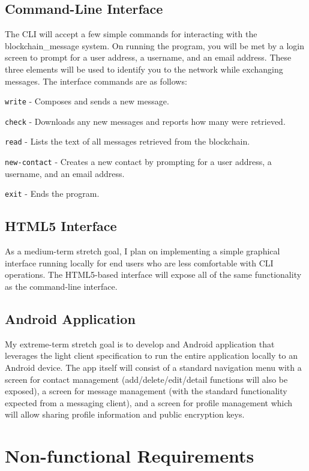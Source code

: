 \documentclass[titlepage]{report}
\begin{document}
\subsection{Command-Line Interface}
The CLI will accept a few simple commands for interacting with the blockchain\_message system. On running the program, you will be met by a login screen to prompt for a user address, a username, and an email address. These three elements will be used to identify you to the network while exchanging messages.
The interface commands are as follows:

\texttt{write} - Composes and sends a new message.

\texttt{check} - Downloads any new messages and reports how many were retrieved.

\texttt{read} - Lists the text of all messages retrieved from the blockchain.

\texttt{new-contact} - Creates a new contact by prompting for a user address, a username, and an email address.

\texttt{exit} - Ends the program.

\subsection{HTML5 Interface}
As a medium-term stretch goal, I plan on implementing a simple graphical interface running locally for end users who are less comfortable with CLI operations. The HTML5-based interface will expose all of the same functionality as the command-line interface.

\subsection{Android Application}
My extreme-term stretch goal is to develop and Android application that leverages the light client specification to run the entire application locally to an Android device. The app itself will consist of a standard navigation menu with a screen for contact management (add/delete/edit/detail functions will also be exposed), a screen for message management (with the standard functionality expected from a messaging client), and a screen for profile management which will allow sharing profile information and public encryption keys.

\section{Non-functional Requirements}
\end{document}
